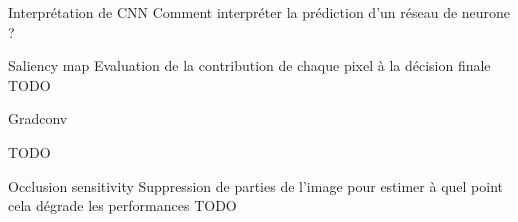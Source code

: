 \begin{frame}{Interprétation de CNN}
  Comment interpréter la prédiction d'un réseau de neurone ?
\end{frame}

\begin{frame}{Saliency map}
  Evaluation de la contribution de chaque pixel à la décision finale
  \alert{TODO}
\end{frame}

\begin{frame}{Gradconv}

  \alert{TODO}
\end{frame}

\begin{frame}{Occlusion sensitivity}
  Suppression de parties de l'image pour estimer à quel point cela dégrade les performances
  \alert{TODO}
\end{frame}
  